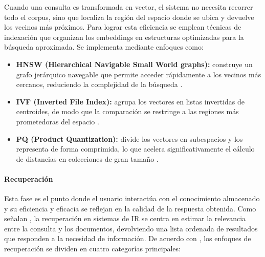 Cuando una consulta es transformada en vector, el sistema no necesita recorrer todo el corpus, sino que localiza la región del espacio donde se ubica y 
devuelve los vecinos más próximos. Para lograr esta eficiencia se emplean técnicas de indexación que organizan los embeddings en estructuras optimizadas para 
la búsqueda aproximada. Se implementa mediante enfoques como:
\begin{itemize}
    \item \textbf{HNSW (Hierarchical Navigable Small World graphs):} construye un grafo jerárquico navegable que permite acceder rápidamente a los vecinos más cercanos, reduciendo la complejidad de la búsqueda \parencite{ma2025vector}.
    \item \textbf{IVF (Inverted File Index):} agrupa los vectores en listas invertidas de centroides, de modo que la comparación se restringe a las regiones más prometedoras del espacio \parencite{ma2025vector}.
    \item \textbf{PQ (Product Quantization):} divide los vectores en subespacios y los representa de forma comprimida, lo que acelera significativamente el cálculo de distancias en colecciones de gran tamaño \parencite{ma2025vector}.
\end{itemize}

\paragraph{Recuperación} Esta fase es el punto donde el usuario interactúa con el conocimiento almacenado y su eficiencia y eficacia se reflejan en la calidad 
de la respuesta obtenida. Como señalan \textcite{fan2021pretraining}, la recuperación en sistemas de IR se centra en estimar la relevancia entre la consulta y los documentos, devolviendo una lista ordenada
de resultados que responden a la necesidad de información.  
De acuerdo con \textcite{hambarde2023ir}, los enfoques de recuperación se dividen en cuatro categorías principales:


